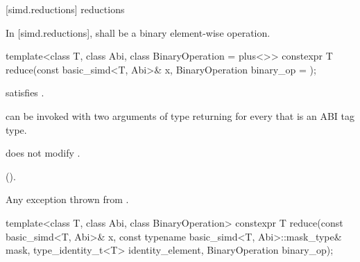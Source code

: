 [simd.reductions]{ reductions}

\pnum
In [simd.reductions],  shall be a binary element-wise operation.


\begin{itemdecl}
template<class T, class Abi, class BinaryOperation = plus<>>
  constexpr T reduce(const basic_simd<T, Abi>& x, BinaryOperation binary_op = {});
\end{itemdecl}

\begin{itemdescr}
  \pnum\constraints
   satisfies .

  \pnum\mandates
   can be invoked with two arguments of type
   returning  for every
   that is an ABI tag type.

  \pnum\expects
   does not modify .

  \pnum\returns
   \foralli{} ().

  \pnum\throws
  Any exception thrown from .
\end{itemdescr}

\begin{itemdecl}
template<class T, class Abi, class BinaryOperation>
  constexpr T reduce(const basic_simd<T, Abi>& x, const typename basic_simd<T, Abi>::mask_type& mask,
                     type_identity_t<T> identity_element, BinaryOperation binary_op);
\end{itemdecl}

